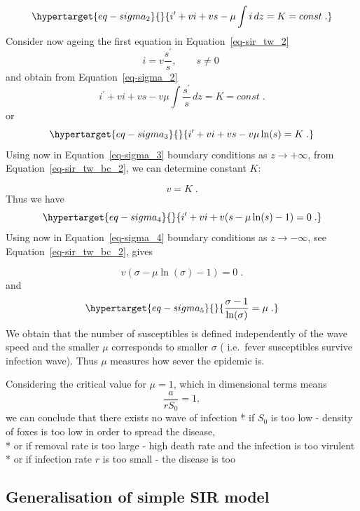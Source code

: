 \documentclass[
  letterpaper,
  DIV=11,
  numbers=noendperiod]{scrreprt}
\theoremstyle{plain}
\theoremstyle{definition}
\theoremstyle{plain}
\theoremstyle{remark}
\begin{document}
\begin{equation}\protect\hypertarget{eq-sigma_2}{}{
 i^{\prime } + v i + v s  - \mu \int i\, dz = K= const\; .
}\label{eq-sigma_2}\end{equation} Consider now ageing the first equation
in Equation~\ref{eq-sir_tw_2} \[
i= v \frac {s^\prime} s, \quad \quad s \neq 0 \; 
\] and obtain from Equation~\ref{eq-sigma_2} \[
 i^{\prime } + v i + v s  - v  \mu \int   \frac {s^\prime} s\, dz = K= const\; .
\] or \begin{equation}\protect\hypertarget{eq-sigma_3}{}{
 i^{\prime } + v i + v s  - v  \mu \ln(s) = K\; .
}\label{eq-sigma_3}\end{equation} Using now in Equation~\ref{eq-sigma_3}
boundary conditions as \(z \to + \infty\), from
Equation~\ref{eq-sir_tw_bc_2}, we can determine constant \(K\):

\[
 v    = K\; .
\] Thus we have \begin{equation}\protect\hypertarget{eq-sigma_4}{}{
 i^{\prime } + v i + v( s  - \mu \ln(s) -1)= 0\; .
}\label{eq-sigma_4}\end{equation} Using now in Equation~\ref{eq-sigma_4}
boundary conditions as \(z \to - \infty\), see
Equation~\ref{eq-sir_tw_bc_2}, gives

\[
 v( \sigma - \mu \ln(\sigma) -1)= 0\; .
\] and \begin{equation}\protect\hypertarget{eq-sigma_5}{}{
\frac{ \sigma- 1}{\ln(\sigma)} = \mu \; . 
}\label{eq-sigma_5}\end{equation} We obtain that the number of
susceptibles is defined independently of the wave speed and the smaller
\(\mu\) corresponds to smaller \(\sigma\) ( i.e.~fever susceptibles
survive infection wave). Thus \(\mu\) measures how sever the epidemic
is.

Considering the critical value for \(\mu =1\), which in dimensional
terms means \[
\frac a { r S_0} = 1, 
\] we can conclude that there exists no wave of infection * if \(S_0\)
is too low - density of foxes is too low in order to spread the
disease,\\
* or if removal rate is too large - high death rate and the infection is
too virulent * or if infection rate \(r\) is too small - the disease is
too

\hypertarget{generalisation-of-simple-sir-model}{%
\subsection{Generalisation of simple SIR
model}\label{generalisation-of-simple-sir-model}}
\end{document}
